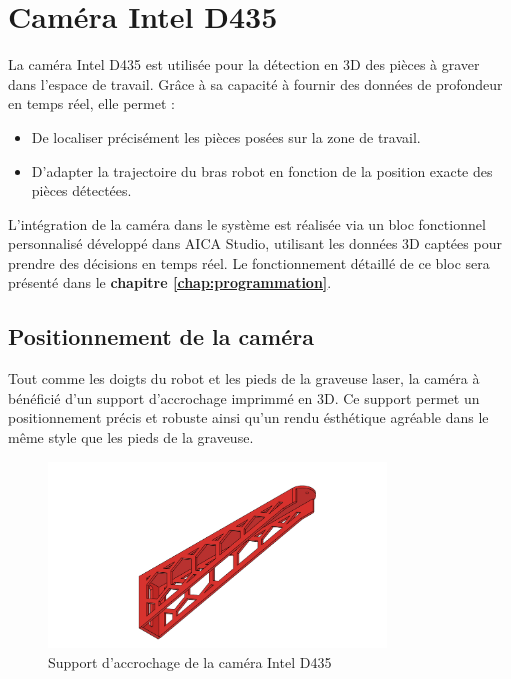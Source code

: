 \section{Caméra Intel D435}

La caméra Intel D435 est utilisée pour la détection en 3D des pièces à graver dans l’espace de travail. Grâce à sa capacité à fournir des données de profondeur en temps réel, elle permet :
\begin{itemize}
    \item De localiser précisément les pièces posées sur la zone de travail.
    \item D’adapter la trajectoire du bras robot en fonction de la position exacte des pièces détectées.
\end{itemize}

L’intégration de la caméra dans le système est réalisée via un bloc fonctionnel personnalisé développé dans AICA Studio, utilisant les données 3D captées pour prendre des décisions en temps réel. Le fonctionnement détaillé de ce bloc sera présenté dans le \textbf{chapitre \ref{chap:programmation}}.

\subsection{Positionnement de la caméra}

Tout comme les doigts du robot et les pieds de la graveuse laser, la caméra à bénéficié d'un support d'accrochage imprimmé en 3D. Ce support permet un positionnement précis et robuste ainsi qu'un rendu ésthétique agréable dans le même style que les pieds de la graveuse.

\begin{figure}[H]
    \centering
    \includegraphics[width=0.8\textwidth]{assets/figures/Porte_camera v6.png}
    \caption{Support d'accrochage de la caméra Intel D435}
    \label{fig:support_camera}
\end{figure}

